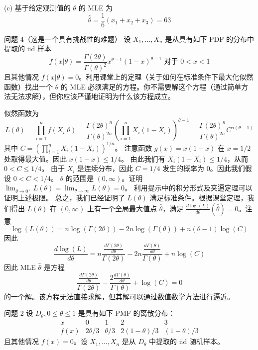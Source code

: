 \begin{questions}
\begin{solution}
(c) 基于给定观测值的 $\theta$ 的 MLE 为
\[
\hat{\theta} = \frac{1}{6}(x_1 + x_2 + x_3) = 63
\]
\end{solution}

\question 问题 4（这是一个具有挑战性的难题）
设 $X_1, \dots, X_n$ 是从具有如下 PDF 的分布中提取的 iid 样本
\[
f(x|\theta) = \frac{\Gamma(2\theta)}{\Gamma(\theta)^2} x^{\theta-1} (1 - x)^{\theta-1} \text{ 对于 } 0 < x < 1
\]
且其他情况 $f(x|\theta) = 0$。利用课堂上的定理（关于如何在标准条件下最大化似然函数）找出一个 $\theta$ 的 MLE 必须满足的方程。你不需要解这个方程（通过简单方法无法求解），但你应该严谨地证明为什么该方程成立。

\begin{solution}
似然函数为
\[
L(\theta) = \prod_{i=1}^n f(X_i|\theta) = \frac{\Gamma(2\theta)^n}{\Gamma(\theta)^{2n}} \left(\prod_{i=1}^n X_i(1 - X_i)\right)^{\theta-1} = \frac{\Gamma(2\theta)^n}{\Gamma(\theta)^{2n}} C^{n(\theta-1)}
\]
其中 $C = (\prod_{i=1}^n X_i(1 - X_i))^{1/n}$。
注意函数 $g(x) = x(1 - x)$ 在 $x = 1/2$ 处取得最大值。因此 $x(1 - x) \le 1/4$。
由此我们有 $X_i(1 - X_i) \le 1/4$，从而 $0 < C \le 1/4$。
由于 $X_i$ 是连续分布，因此 $C = 1/4$ 发生的概率为 0。因此我们假设 $0 < C < 1/4$。
$\theta$ 的范围是 $(0, \infty)$。证明 $\lim_{\theta \to 0^+} L(\theta) = \lim_{\theta \to \infty} L(\theta) = 0$。
利用提示中的积分形式及夹逼定理可以证明上述极限。
总之，我们已经证明了 $L(\theta)$ 满足标准条件。根据课堂定理，我们得出 $L(\theta)$ 在 $(0, \infty)$ 上有一个全局最大值点 $\hat{\theta}$，满足 $\frac{d\log(L)}{d\theta}(\hat{\theta}) = 0$。注意
\[
\log(L(\theta)) = n\log(\Gamma(2\theta)) - 2n\log(\Gamma(\theta)) + n(\theta - 1)\log(C)
\]
因此
\[
\frac{d\log(L)}{d\theta} = n\frac{\frac{d\Gamma(2\theta)}{d\theta}}{\Gamma(2\theta)} - 2n\frac{\frac{d\Gamma(\theta)}{d\theta}}{\Gamma(\theta)} + n\log(C)
\]
因此 MLE $\hat{\theta}$ 是方程
\[
\frac{\frac{d\Gamma(2\theta)}{d\theta}}{\Gamma(2\theta)} - \frac{2\frac{d\Gamma(\theta)}{d\theta}}{\Gamma(\theta)} + \log(C) = 0
\]
的一个解。该方程无法直接求解，但其解可以通过数值数学方法进行逼近。
\end{solution}

\question 问题 2 设 $D_{\theta}, 0 \le \theta \le 1$ 是具有如下 PMF 的离散分布：
\[
\begin{array}{c|c|c|c|c}
x & 0 & 1 & 2 & 3 \\
\hline
f(x) & 2\theta/3 & \theta/3 & 2(1-\theta)/3 & (1-\theta)/3
\end{array}
\]
且其他情况 $f(x) = 0$。设 $X_1, \dots, X_n$ 是从 $D_{\theta}$ 中提取的 iid 随机样本。


\end{questions}
